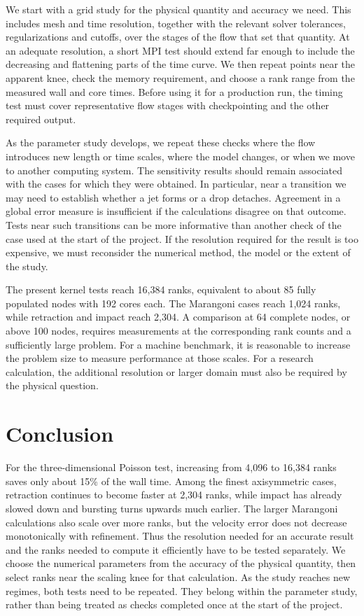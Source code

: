 \documentclass[11pt,a4paper]{article}
\begin{document}
We start with a grid study for the physical quantity and accuracy we need.
This includes mesh and time resolution, together with the relevant solver
tolerances, regularizations and cutoffs, over the stages of the flow that
set that quantity. At an adequate resolution, a short MPI test should
extend far enough to include the decreasing and flattening parts of the
time curve. We then repeat points near the apparent knee, check the memory
requirement, and choose a rank range from the measured wall and core
times. Before using it for a production run, the timing test must cover
representative flow stages with checkpointing and the other required output.

As the parameter study develops, we repeat these checks where the flow
introduces new length or time scales, where the model changes, or when we
move to another computing system. The sensitivity results should remain
associated with the cases for which they were obtained. In particular,
near a transition we may need to establish whether a jet forms or a drop
detaches. Agreement in a global error measure is insufficient if the
calculations disagree on that outcome. Tests near such transitions can be
more informative than another check of the case used at the start of the
project. If the resolution required for the result is too expensive, we
must reconsider the numerical method, the model or the extent of the study.

The present kernel tests reach 16,384 ranks, equivalent to about 85 fully
populated nodes with 192 cores each. The Marangoni cases reach 1,024 ranks,
while retraction and impact reach 2,304. A comparison at 64 complete nodes,
or above 100 nodes, requires measurements at the corresponding rank counts
and a sufficiently large problem. For a machine benchmark, it is reasonable
to increase the problem size to measure performance at those scales. For a
research calculation, the additional resolution or larger domain must also
be required by the physical question.

\section{Conclusion}

For the three-dimensional Poisson test, increasing from 4,096 to 16,384
ranks saves only about 15\% of the wall time. Among the finest axisymmetric
cases, retraction continues to become faster at 2,304 ranks, while impact
has already slowed down and bursting turns upwards much earlier. The
larger Marangoni calculations also scale over more ranks, but the velocity
error does not decrease monotonically with refinement. Thus the resolution
needed for an accurate result and the ranks needed to compute it efficiently
have to be tested separately. We choose the numerical parameters from the
accuracy of the physical quantity, then select ranks near the scaling knee
for that calculation. As the study reaches new regimes, both tests need
to be repeated. They belong within the parameter study, rather than being
treated as checks completed once at the start of the project.

\clearpage
{\raggedright
\nocite{popinet2009}


}
\end{document}
